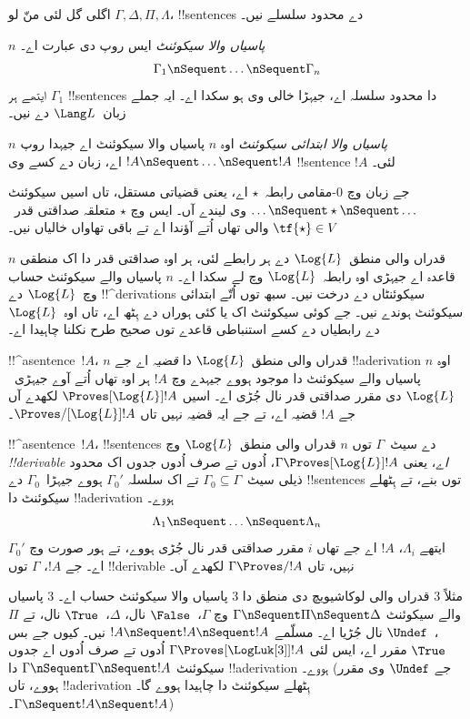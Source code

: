 \documentclass[../../../include/open-logic-section]{subfiles}
\begin{document}


اگلی گل لئی منّ لو $\Gamma, \Delta, \Pi, \Lambda$،
!!{sentence}s دے محدود سلسلے نیں۔

\begin{defn}[سیکوئنٹ]
\emph{$n$ پاسیاں والا سیکوئنٹ} ایس روپ دی عبارت اے۔
\[
\Gamma_1 \nSequent \dots \nSequent \Gamma_n
\]
ایتھے ہر $\Gamma_1$ !!{sentence}s دا محدود سلسلہ اے، جیہڑا خالی وی ہو سکدا اے۔
ایہ جملے زبان~$\Lang L$ دے نیں۔
\end{defn}

\begin{defn}
\emph{$n$ پاسیاں والا ابتدائی سیکوئنٹ} اوہ $n$ پاسیاں والا
سیکوئنٹ اے جیہدا روپ $!A \nSequent \dots \nSequent !A$ اے،
زبان دے کسے وی !!{sentence} $!A$ لئی۔

جے زبان وچ $0$-مقامی رابطہ~$\star$ اے، یعنی قضیاتی مستقل،
تاں اسیں سیکوئنٹ $\dots \nSequent
\star \nSequent \dots$ وی لیندے آں۔ ایس وچ $\star$ متعلقہ
صداقتی قدر~$\tf{\star} \in V$ والی تھاں اُتے آؤندا اے تے
باقی تھاواں خالیاں نیں۔
\end{defn}

$n$ قدراں والی منطق~$\Log{L}$ دے ہر رابطے لئی، ہر اوہ
صداقتی قدر دا اک منطقی قاعدہ اے جیہڑی اوہ رابطہ~$\Log{L}$
وچ لے سکدا اے۔ $n$ پاسیاں والے سیکوئنٹ حساب وچ~$\Log{L}$
دے !!^{derivation}s سیکوئنٹاں دے درخت نیں۔ سبھ توں اُتّے
ابتدائی سیکوئنٹ ہوندے نیں۔ جے کوئی سیکوئنٹ اک یا کئی ہوراں
دے ہِٹھ اے، تاں اوہ~$\Log{L}$ دے رابطیاں دے کسے استنباطی
قاعدے توں صحیح طرح نکلنا چاہیدا اے۔

\begin{defn}[قضیے]
!!^a{sentence}~$!A$، $n$ قدراں والی منطق~$\Log{L}$ دا
\emph{قضیہ} اے جے !!a{derivation} اوہ $n$ پاسیاں والے
سیکوئنٹ دا موجود ہووے جیہدے وچ $!A$ ہر اوہ تھاں اُتے آوے جیہڑی~$\Log{L}$ دی مقرر
صداقتی قدر نال جُڑی اے۔ اسیں $\Proves[\Log{L}]
!A$ لکھدے آں جے $!A$ قضیہ اے، تے جے ایہ قضیہ نہیں تاں $\Proves/[\Log{L}] !A$۔
\end{defn}

\begin{defn}[!!^{derivability}]
!!^a{sentence}~$!A$، !!{sentence}s دے سیٹ~$\Gamma$ توں
$n$ قدراں والی منطق~$\Log{L}$ وچ \emph{!!{derivable} اے}،
یعنی $\Gamma
\Proves[\Log{L}] !A$، اُدوں تے صرف اُدوں جدوں اک محدود
ذیلی سیٹ~$\Gamma_0 \subseteq
\Gamma$ تے اک سلسلہ $\Gamma_0'$ ہووے جیہڑا~$\Gamma_0$ دے
!!{sentence}s توں بنے، تے ہِٹھلے سیکوئنٹ دا
!!a{derivation} ہووے۔
\[ \Lambda_1 \nSequent \dots \nSequent \Lambda_n \]
ایتھے $\Lambda_i$، $!A$ اے جے تھاں $i$ مقرر صداقتی قدر نال
جُڑی ہووے، تے ہور صورت وچ $\Gamma_0'$ اے۔ جے $!A$،
$\Gamma$ توں !!{derivable} نہیں، تاں $\Gamma \Proves/ !A$
لکھدے آں۔
\end{defn}

مثلاً $3$ قدراں والی لوکاشیویچ دی منطق دا $3$ پاسیاں والا
سیکوئنٹ حساب اے۔ $3$ پاسیاں والے سیکوئنٹ $\Gamma \nSequent \Pi \nSequent
\Delta$ وچ $\Gamma$،~$\False$ نال، $\Delta$،~$\True$ نال،
تے $\Pi$،~$\Undef$ نال جُڑیا اے۔ مسلّمے $!A \nSequent !A \nSequent !A$
نیں۔ کیوں جے بس $\True$ مقرر اے، ایس لئی
$\Gamma \Proves[\LogLuk[3]] !A$ اُدوں تے صرف اُدوں اے جدوں
سیکوئنٹ $\Gamma \nSequent \Gamma \nSequent !A$ دا !!a{derivation}
ہووے۔ (جے $\Undef$ وی مقرر ہووے، تاں !!a{derivation} ہِٹھلے سیکوئنٹ دا چاہیدا ہووے گا۔
$\Gamma \nSequent !A \nSequent !A$۔)
\end{document}
